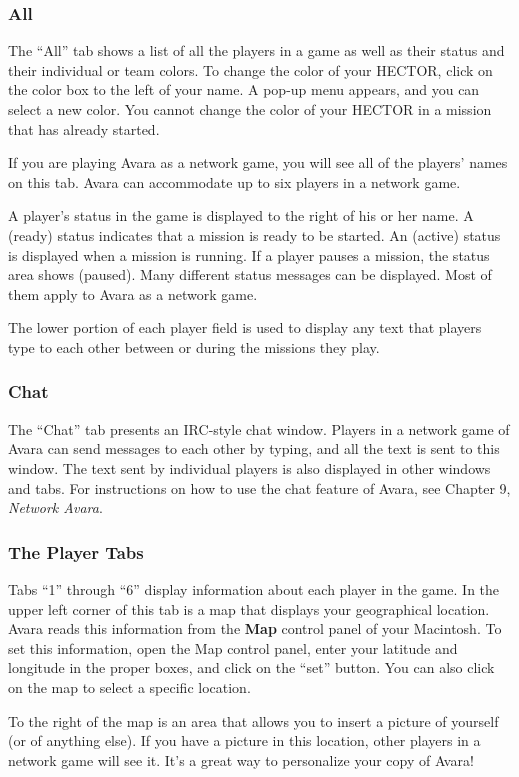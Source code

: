\documentclass{article}
\begin{document}
\subsubsection{All}
The ``All'' tab shows a list of all the players in a game as well as their status and their individual or team colors. To change the color of your HECTOR, click on the color box to the left of your name. A pop-up menu appears, and you can select a new color. You cannot change the color of your HECTOR in a mission that has already started.

If you are playing Avara as a network game, you will see all of the players' names on this tab. Avara can accommodate up to six players in a network game.

A player's status in the game is displayed to the right of his or her name. A (ready) status indicates that a mission is ready to be started. An (active) status is displayed when a mission is running. If a player pauses a mission, the status area shows (paused). Many different status messages can be displayed. Most of them apply to Avara as a network game.

The lower portion of each player field is used to display any text that players type to each other between or during the missions they play.

\subsubsection{Chat}
The ``Chat'' tab presents an IRC-style chat window. Players in a network game of Avara can send messages to each other by typing, and all the text is sent to this window. The text sent by individual players is also displayed in other windows and tabs. For instructions on how to use the chat feature of Avara, see Chapter 9, \textit{Network Avara}.

\subsubsection{The Player Tabs}
Tabs ``1'' through ``6'' display information about each player in the game. In the upper left corner of this tab is a map that displays your geographical location. Avara reads this information from the \textbf{Map} control panel of your Macintosh. To set this information, open the Map control panel, enter your latitude and longitude in the proper boxes, and click on the ``set'' button. You can also click on the map to select a specific location.

To the right of the map is an area that allows you to insert a picture of yourself (or of anything else). If you have a picture in this location, other players in a network game will see it. It's a great way to personalize your copy of Avara!
\end{document}
